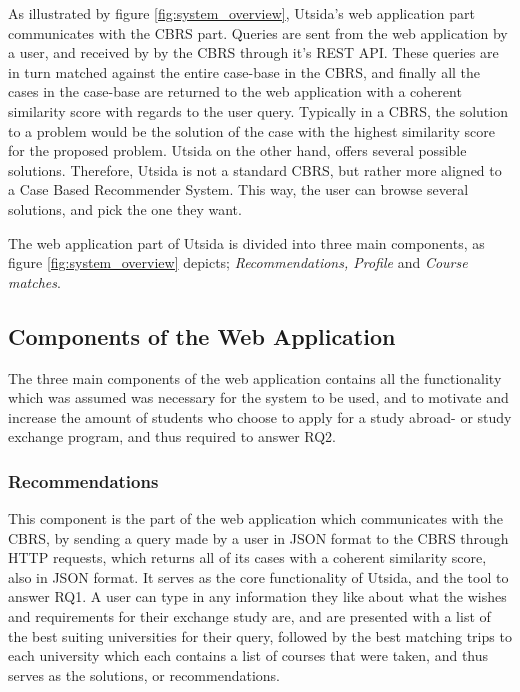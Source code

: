 As illustrated by figure \ref{fig:system_overview}, Utsida's web application part communicates with the CBRS part. Queries are sent from the web application by a user, and received by by the CBRS through it's REST API. These queries are in turn matched against the entire case-base in the CBRS, and finally all the cases in the case-base are returned to the web application with a coherent similarity score with regards to the user query. Typically in a CBRS, the solution to a problem would be the solution of the case with the highest similarity score for the proposed problem. Utsida on the other hand, offers several possible solutions. Therefore, Utsida is not a standard CBRS, but rather more aligned to a Case Based Recommender System. This way, the user can browse several solutions, and pick the one they want. 


The web application part of Utsida is divided into three main components, as figure \ref{fig:system_overview} depicts; \emph{Recommendations, Profile} and \emph{Course matches}. 

\subsection{Components of the Web Application}
The three main components of the web application contains all the functionality which was assumed was necessary for the system to be used, and to motivate and increase the amount of students who choose to apply for a study abroad- or study exchange program, and thus required to answer RQ2.

\subsubsection{Recommendations}
This component is the part of the web application which communicates with the CBRS, by sending a query made by a user in JSON format to the CBRS through HTTP requests, which returns all of its cases with a coherent similarity score, also in JSON format. It serves as the core functionality of Utsida, and the tool to answer RQ1. A user can type in any information they like about what the wishes and requirements for their exchange study are, and are presented with a list of the best suiting universities for their query, followed by the best matching trips to each university which each contains a list of courses that were taken, and thus serves as the solutions, or recommendations.

